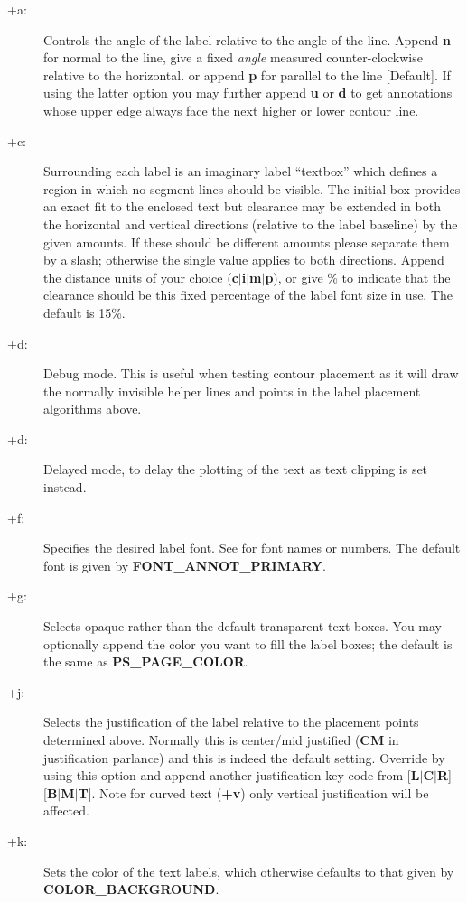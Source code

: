 \begin{description}
\item [+a:]  Controls the angle of the label relative to the angle of the line.  Append \textbf{n}
for normal to the line, give a fixed \emph{angle} measured counter-clockwise relative to the
horizontal. or append \textbf{p} for parallel to the line [Default].  If using 
the latter option you may further append \textbf{u} or \textbf{d} to get annotations whose upper edge
always face the next higher or lower contour line.
\item [+c:] Surrounding each label is an imaginary label ``textbox'' which defines a region in
which no segment lines should be visible.  The initial box provides an exact fit to the enclosed
text but clearance may be extended in both the horizontal and vertical directions (relative to the label
baseline) by the given amounts.  If these should be different amounts please separate them by
a slash; otherwise the single value applies to both directions.  Append the distance units of
your choice (\textbf{c$|$i$|$m$|$p}), or give \% to indicate that the clearance should be this
fixed percentage of the label font size in use.  The default is 15\%.
\item [+d:] Debug mode.  This is useful when testing contour placement as it will draw the normally
invisible helper lines and points in the label placement algorithms above.
\item [+d:] Delayed mode, to delay the plotting of the text as text clipping is set instead.
\item [+f:] Specifies the desired label font.  See  for font names or numbers.  The
default font is given by \textbf{FONT\_ANNOT\_PRIMARY}.
\item [+g:] Selects opaque rather than the default transparent text boxes.  You may optionally append
the color you want to fill the label boxes; the default is the same as \textbf{PS\_PAGE\_COLOR}.
\item [+j:] Selects the justification of the label relative to the placement points determined
above.  Normally this is center/mid justified (\textbf{CM} in  justification parlance) and
this is indeed the default setting.  Override by using this option and append another justification
key code from [\textbf{L$|$C$|$R}][\textbf{B$|$M$|$T}].  Note for curved text (\textbf{+v}) only vertical
justification will be affected.
\item [+k:] Sets the color of the text labels, which otherwise defaults to that given by \textbf{COLOR\_BACKGROUND}.

\end{description}
